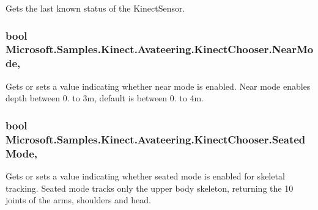 Gets the last known status of the Kinect\+Sensor. 

\hypertarget{class_microsoft_1_1_samples_1_1_kinect_1_1_avateering_1_1_kinect_chooser_a18582629cc383f05b349184f3445e46c}{
\subsubsection[{Near\+Mode}]{\setlength{\rightskip}{0pt plus 5cm}bool Microsoft.\+Samples.\+Kinect.\+Avateering.\+Kinect\+Chooser.\+Near\+Mode\hspace{0.3cm}{\ttfamily [get]}, {\ttfamily [set]}}}\label{class_microsoft_1_1_samples_1_1_kinect_1_1_avateering_1_1_kinect_chooser_a18582629cc383f05b349184f3445e46c}


Gets or sets a value indicating whether near mode is enabled. Near mode enables depth between 0. to 3m, default is between 0. to 4m. 

\hypertarget{class_microsoft_1_1_samples_1_1_kinect_1_1_avateering_1_1_kinect_chooser_abcf49a8b0d0d77bfed8bcc4ff32c9cb5}{
\subsubsection[{Seated\+Mode}]{\setlength{\rightskip}{0pt plus 5cm}bool Microsoft.\+Samples.\+Kinect.\+Avateering.\+Kinect\+Chooser.\+Seated\+Mode\hspace{0.3cm}{\ttfamily [get]}, {\ttfamily [set]}}}\label{class_microsoft_1_1_samples_1_1_kinect_1_1_avateering_1_1_kinect_chooser_abcf49a8b0d0d77bfed8bcc4ff32c9cb5}


Gets or sets a value indicating whether seated mode is enabled for skeletal tracking. Seated mode tracks only the upper body skeleton, returning the 10 joints of the arms, shoulders and head. 

